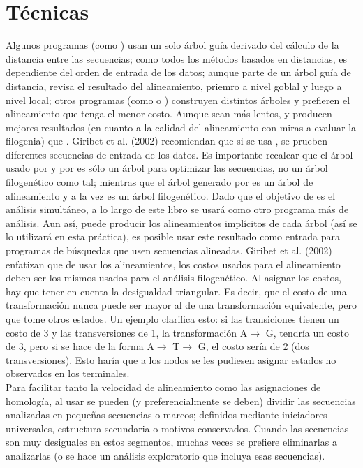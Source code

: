 \section{T\'ecnicas}
Algunos programas (como ) usan un solo \'arbol gu\'ia derivado del c\'alculo de la distancia entre las 
secuencias; como todos los m\'etodos basados en distancias, es dependiente del orden de entrada de los datos;  aunque parte de un \'arbol gu\'ia de  distancia, revisa el resultado del alineamiento, priemro a nivel goblal y luego a nivel local; otros 
programas (como  o ) construyen distintos \'arboles y prefieren el alineamiento que tenga el menor 
costo. Aunque sean m\'as lentos,  y  producen mejores resultados (en cuanto a la calidad del 
alineamiento con miras a evaluar la filogenia) que . Giribet et al. (2002) recomiendan que si se usa 
, se prueben diferentes secuencias de entrada de los datos. Es importante recalcar que el \'arbol usado por 
 y por  es s\'olo un \'arbol para optimizar las secuencias, no un \'arbol filogen\'etico como tal; 
mientras que el \'arbol generado por  es un \'arbol de alineamiento y a la vez es un \'arbol filogen\'etico. Dado que el objetivo de  es el an\'alisis simult\'aneo, a lo largo de este libro se usar\'a  como otro programa m\'as de an\'alisis. Aun as\'i,  puede producir los alineamientos impl\'icitos de cada \'arbol (as\'i se lo utilizar\'a en esta pr\'actica), es posible usar este resultado como entrada para programas de b\'usquedas que usen secuencias alineadas. Giribet 
et al. (2002) enfatizan que de usar los alineamientos, los costos usados para el alineamiento deben ser los mismos usados 
para el an\'alisis filogen\'etico. Al asignar los costos, hay que tener en cuenta la desigualdad triangular. Es decir, que el 
costo de una transformaci\'on nunca puede ser mayor al de una transformaci\'on equivalente, pero que tome otros estados. 
Un ejemplo clarifica esto: si las transiciones tienen un costo de 3 y las transversiones de 1, la transformaci\'on 
A$\rightarrow$ G, tendr\'ia un costo de 3, pero si se hace de la forma A$\rightarrow$ T$\rightarrow$ G, el costo ser\'ia de 
2 (dos transversiones). Esto har\'ia que a los nodos se les pudiesen asignar estados no observados en los terminales.\\
Para facilitar tanto la velocidad de alineamiento como las asignaciones de homolog\'ia, al usar  se pueden 
(y preferencialmente se deben) dividir las secuencias analizadas en peque\~nas secuencias o marcos; definidos mediante 
iniciadores universales, estructura secundaria o motivos conservados. Cuando las secuencias son muy desiguales en estos 
segmentos, muchas veces se prefiere eliminarlas a analizarlas (o se hace un an\'alisis exploratorio que incluya esas 
secuencias).
